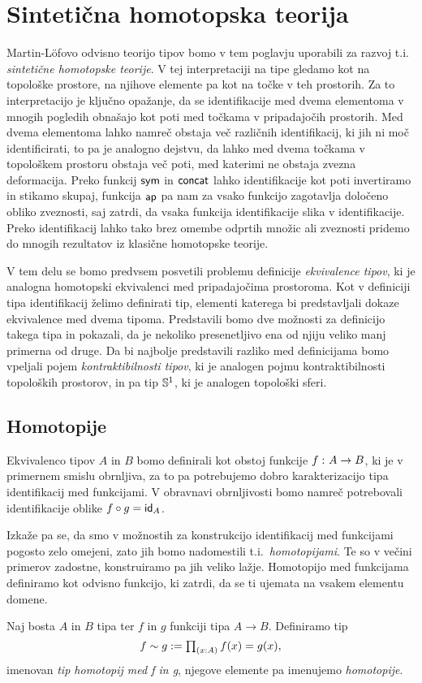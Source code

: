 \section{Sintetična homotopska teorija}
Martin-Löfovo odvisno teorijo tipov bomo v tem poglavju uporabili za razvoj t.i. \emph{sintetične homotopske teorije}. V tej interpretaciji na tipe gledamo kot na topološke prostore, na njihove elemente pa kot na točke v teh prostorih. Za to interpretacijo je ključno opažanje, da se identifikacije med dvema elementoma v mnogih pogledih obnašajo kot poti med točkama v pripadajočih prostorih. Med dvema elementoma lahko namreč obstaja več različnih identifikacij, ki jih ni moč identificirati, to pa je analogno dejstvu, da lahko med dvema točkama v topološkem prostoru obstaja več poti, med katerimi ne obstaja zvezna deformacija. Preko funkcij \(\textnormal{\textsf{sym}}\) in \(\textnormal{\textsf{concat}}\) lahko identifikacije kot poti invertiramo in stikamo skupaj, funkcija \(\textnormal{\textsf{ap}}\) pa nam za vsako funkcijo zagotavlja določeno obliko zveznosti, saj zatrdi, da vsaka funkcija identifikacije slika v identifikacije. Preko identifikacij lahko tako brez omembe odprtih množic ali zveznosti pridemo do mnogih rezultatov iz klasične homotopske teorije.

V tem delu se bomo predvsem posvetili problemu definicije \emph{ekvivalence tipov}, ki je analogna homotopski ekvivalenci med pripadajočima prostoroma. Kot v definiciji tipa  identifikacij želimo definirati tip, elementi katerega bi predstavljali dokaze ekvivalence med dvema tipoma. Predstavili bomo dve možnosti za definicijo takega tipa in pokazali, da je nekoliko presenetljivo ena od njiju veliko manj primerna od druge. Da bi najbolje predstavili razliko med definicijama bomo vpeljali pojem \emph{kontraktibilnosti tipov}, ki je analogen pojmu kontraktibilnosti topoloških prostorov, in pa tip \(\mathbb{S}^{1}\), ki je analogen topološki sferi.

\subsection{Homotopije}
Ekvivalenco tipov \(A\) in \(B\) bomo definirali kot obstoj funkcije \(f \,\colon A \to B\), ki
je v primernem smislu obrnljiva, za to pa potrebujemo dobro karakterizacijo tipa identifikacij med funkcijami. V obravnavi obrnljivosti bomo namreč potrebovali identifikacije oblike \(f \circ g = \textnormal{\textsf{id}}_{A}\).

Izkaže pa se, da smo v možnostih za konstrukcijo identifikacij med funkcijami pogosto zelo omejeni, zato jih bomo nadomestili t.i.~\emph{homotopijami}. Te so v večini primerov zadostne, konstruiramo pa jih veliko lažje. Homotopijo med funkcijama definiramo kot odvisno funkcijo, ki zatrdi, da se ti ujemata na vsakem elementu domene.
\begin{definicija}
  Naj bosta \(A\) in \(B\) tipa ter \(f\) in \(g\) funkciji tipa \(A \to B\). Definiramo tip
  \[f \sim g := \textstyle \prod_{\left( x : A \right)} f(x) = g(x),\]
  imenovan \emph{tip homotopij med f in g}, njegove elemente pa imenujemo \emph{homotopije}.
\end{definicija}

